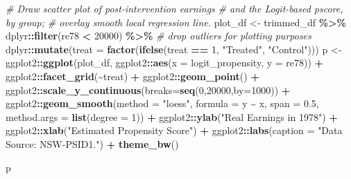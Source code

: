 \documentclass[
]{article}
\newenvironment{Shaded}{\begin{snugshade}}{\end{snugshade}}
\newcommand{\AttributeTok}[1]{\textcolor[rgb]{0.13,0.29,0.53}{#1}}
\newcommand{\CommentTok}[1]{\textcolor[rgb]{0.56,0.35,0.01}{\textit{#1}}}
\newcommand{\DecValTok}[1]{\textcolor[rgb]{0.00,0.00,0.81}{#1}}
\newcommand{\FloatTok}[1]{\textcolor[rgb]{0.00,0.00,0.81}{#1}}
\newcommand{\FunctionTok}[1]{\textcolor[rgb]{0.13,0.29,0.53}{\textbf{#1}}}
\newcommand{\NormalTok}[1]{#1}
\newcommand{\OtherTok}[1]{\textcolor[rgb]{0.56,0.35,0.01}{#1}}
\newcommand{\SpecialCharTok}[1]{\textcolor[rgb]{0.81,0.36,0.00}{\textbf{#1}}}
\newcommand{\StringTok}[1]{\textcolor[rgb]{0.31,0.60,0.02}{#1}}
\begin{document}
\begin{Shaded}
\begin{Highlighting}[]
\CommentTok{\# Draw scatter plot of post{-}intervention earnings}
\CommentTok{\# and the Logit{-}based pscore, by group;}
\CommentTok{\# overlay smooth local regression line.}
\NormalTok{plot\_df }\OtherTok{\textless{}{-}}\NormalTok{ trimmed\_df }\SpecialCharTok{\%\textgreater{}\%}
\NormalTok{dplyr}\SpecialCharTok{::}\FunctionTok{filter}\NormalTok{(re78 }\SpecialCharTok{\textless{}} \DecValTok{20000}\NormalTok{) }\SpecialCharTok{\%\textgreater{}\%} \CommentTok{\# drop outliers for plotting purposes}
\NormalTok{dplyr}\SpecialCharTok{::}\FunctionTok{mutate}\NormalTok{(}\AttributeTok{treat =} \FunctionTok{factor}\NormalTok{(}\FunctionTok{ifelse}\NormalTok{(treat }\SpecialCharTok{==} \DecValTok{1}\NormalTok{, }\StringTok{"Treated"}\NormalTok{, }\StringTok{"Control"}\NormalTok{)))}
\NormalTok{p }\OtherTok{\textless{}{-}}\NormalTok{ ggplot2}\SpecialCharTok{::}\FunctionTok{ggplot}\NormalTok{(plot\_df, ggplot2}\SpecialCharTok{::}\FunctionTok{aes}\NormalTok{(}\AttributeTok{x =}\NormalTok{ logit\_propensity, }\AttributeTok{y =}\NormalTok{ re78)) }\SpecialCharTok{+}
\NormalTok{ggplot2}\SpecialCharTok{::}\FunctionTok{facet\_grid}\NormalTok{(}\SpecialCharTok{\textasciitilde{}}\NormalTok{treat) }\SpecialCharTok{+}
\NormalTok{ggplot2}\SpecialCharTok{::}\FunctionTok{geom\_point}\NormalTok{() }\SpecialCharTok{+} 
\NormalTok{ggplot2}\SpecialCharTok{::}\FunctionTok{scale\_y\_continuous}\NormalTok{(}\AttributeTok{breaks=}\FunctionTok{seq}\NormalTok{(}\DecValTok{0}\NormalTok{,}\DecValTok{20000}\NormalTok{,}\AttributeTok{by=}\DecValTok{1000}\NormalTok{)) }\SpecialCharTok{+}
\NormalTok{ggplot2}\SpecialCharTok{::}\FunctionTok{geom\_smooth}\NormalTok{(}\AttributeTok{method =} \StringTok{"loess"}\NormalTok{, }\AttributeTok{formula =}\NormalTok{ y }\SpecialCharTok{\textasciitilde{}}\NormalTok{ x, }\AttributeTok{span =} \FloatTok{0.5}\NormalTok{, }
                                        \AttributeTok{method.args =} \FunctionTok{list}\NormalTok{(}\AttributeTok{degree =} \DecValTok{1}\NormalTok{)) }\SpecialCharTok{+}
\NormalTok{ggplot2}\SpecialCharTok{::}\FunctionTok{ylab}\NormalTok{(}\StringTok{"Real Earnings in 1978"}\NormalTok{) }\SpecialCharTok{+}
\NormalTok{ggplot2}\SpecialCharTok{::}\FunctionTok{xlab}\NormalTok{(}\StringTok{"Estimated Propensity Score"}\NormalTok{) }\SpecialCharTok{+}
\NormalTok{ggplot2}\SpecialCharTok{::}\FunctionTok{labs}\NormalTok{(}\AttributeTok{caption =} \StringTok{"Data Source: NSW{-}PSID1."}\NormalTok{) }\SpecialCharTok{+}
\FunctionTok{theme\_bw}\NormalTok{()}

\NormalTok{p}
\end{Highlighting}
\end{Shaded}
\end{document}
